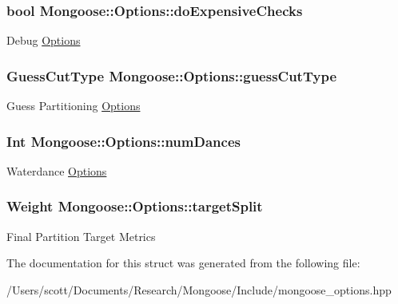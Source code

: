 \subsubsection[{\texorpdfstring{do\+Expensive\+Checks}{doExpensiveChecks}}]{\setlength{\rightskip}{0pt plus 5cm}bool Mongoose\+::\+Options\+::do\+Expensive\+Checks}\hypertarget{struct_mongoose_1_1_options_a75794c7e8f81ebc9cf7f7eef07f56eb4}{}\label{struct_mongoose_1_1_options_a75794c7e8f81ebc9cf7f7eef07f56eb4}
Debug \hyperlink{struct_mongoose_1_1_options}{Options} 
\subsubsection[{\texorpdfstring{guess\+Cut\+Type}{guessCutType}}]{\setlength{\rightskip}{0pt plus 5cm}Guess\+Cut\+Type Mongoose\+::\+Options\+::guess\+Cut\+Type}\hypertarget{struct_mongoose_1_1_options_a31abd6eab9505fb7d3964e314f75b18c}{}\label{struct_mongoose_1_1_options_a31abd6eab9505fb7d3964e314f75b18c}
Guess Partitioning \hyperlink{struct_mongoose_1_1_options}{Options} 
\subsubsection[{\texorpdfstring{num\+Dances}{numDances}}]{\setlength{\rightskip}{0pt plus 5cm}Int Mongoose\+::\+Options\+::num\+Dances}\hypertarget{struct_mongoose_1_1_options_ab1d4fb2e1c43f58fd0e3b0af718cc47e}{}\label{struct_mongoose_1_1_options_ab1d4fb2e1c43f58fd0e3b0af718cc47e}
Waterdance \hyperlink{struct_mongoose_1_1_options}{Options} 
\subsubsection[{\texorpdfstring{target\+Split}{targetSplit}}]{\setlength{\rightskip}{0pt plus 5cm}Weight Mongoose\+::\+Options\+::target\+Split}\hypertarget{struct_mongoose_1_1_options_a26ae6bb0a93bd36a365c472877b6d5e9}{}\label{struct_mongoose_1_1_options_a26ae6bb0a93bd36a365c472877b6d5e9}
Final Partition Target Metrics 

The documentation for this struct was generated from the following file\+:\begin{DoxyCompactItemize}
\item 
/\+Users/scott/\+Documents/\+Research/\+Mongoose/\+Include/mongoose\+\_\+options.\+hpp\end{DoxyCompactItemize}
